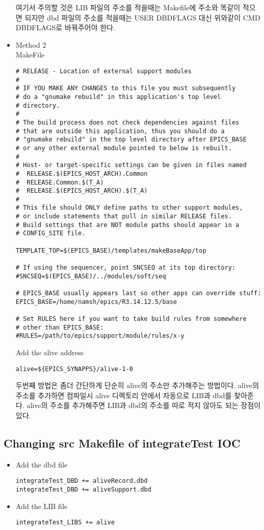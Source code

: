 \documentclass[11pt
  , a4paper
  , article
  , oneside
]{memoir}
\begin{document}
\begin{itemize}
\begin{lstlisting}[style=termstyle]
\end{lstlisting}
여기서 주의할 것은 LIB 파일의 주소를 적을때는 Makefile에 주소와 똑같이 적으면 되지만 dbd 파일의 주소를 
적을때는  USER DBDFLAGS 대신 위와같이 CMD DBDFLAGS로 바꿔주어야 한다.
\item Method 2\\
MakeFile
\begin{lstlisting}[style=termstyle]
# RELEASE - Location of external support modules
#
# IF YOU MAKE ANY CHANGES to this file you must subsequently
# do a "gnumake rebuild" in this application's top level
# directory.
#
# The build process does not check dependencies against files
# that are outside this application, thus you should do a
# "gnumake rebuild" in the top level directory after EPICS_BASE
# or any other external module pointed to below is rebuilt.
#
# Host- or target-specific settings can be given in files named
#  RELEASE.$(EPICS_HOST_ARCH).Common
#  RELEASE.Common.$(T_A)
#  RELEASE.$(EPICS_HOST_ARCH).$(T_A)
#
# This file should ONLY define paths to other support modules,
# or include statements that pull in similar RELEASE files.
# Build settings that are NOT module paths should appear in a
# CONFIG_SITE file.

TEMPLATE_TOP=$(EPICS_BASE)/templates/makeBaseApp/top

# If using the sequencer, point SNCSEQ at its top directory:
#SNCSEQ=$(EPICS_BASE)/../modules/soft/seq

# EPICS_BASE usually appears last so other apps can override stuff:
EPICS_BASE=/home/namsh/epics/R3.14.12.5/base

# Set RULES here if you want to take build rules from somewhere
# other than EPICS_BASE:
#RULES=/path/to/epics/support/module/rules/x-y
\end{lstlisting}
Add the alive address
\begin{lstlisting}[style=termstyle]
alive=${EPICS_SYNAPPS}/alive-1-0
\end{lstlisting}
두번째 방법은 좀더 간단하게 단순히 alive의 주소만 추가해주는 방법이다. alive의 주소를 추가하면 컴파일시 alive 디렉토리 안에서 자동으로 LIB과 dbd를 찾아준다. alive의 주소를 추가해주면 LIB과 dbd의 주소를 따로 적지 않아도 되는 장점이 있다. 
\end{itemize}
\subsection{Changing src Makefile of integrateTest IOC}
\begin{itemize}

	\item Add the dbd file
	\begin{lstlisting}[style=termstyle]
integrateTest_DBD += aliveRecord.dbd   
integrateTest_DBD += aliveSupport.dbd
\end{lstlisting}
	\item Add the LIB file
	\begin{lstlisting}[style=termstyle]
integrateTest_LIBS += alive
\end{lstlisting}
\end{itemize}
\end{document}
